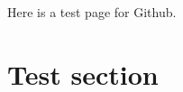 \documentclass{article}
\begin{document}
Here is a test page for Github.
\section{Test section}
\end{document}
